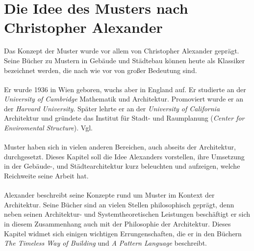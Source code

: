 \documentclass[fontsize=11pt,a4paper,final]{scrreprt}[2003/01/01]
\begin{document}
\chapter{Die Idee des Musters nach Christopher Alexander}\label{Muster}
Das Konzept der Muster wurde vor allem von Christopher Alexander geprägt. Seine Bücher zu Mustern in Gebäude und Städtebau können heute als Klassiker bezeichnet werden, die nach wie vor von großer Bedeutung sind. \\ \\ 
Er wurde 1936 in Wien geboren, wuchs aber in England auf. Er studierte an der\textit{ University of Cambridge} Mathematik und Architektur. Promoviert wurde er an der \textit{Harvard University}. Später lehrte er an der \textit{University of California} Architektur und gründete das Institut für Stadt- und Raumplanung (\textit{Center for Enviromental Structure}). Vgl. \cite{ChristopherAlexanderWikiDe}\\ \\
Muster haben sich in vielen anderen Bereichen, auch abseits der Architektur, durchgesetzt. Dieses Kapitel soll die Idee Alexanders vorstellen, ihre Umsetzung in der Gebäude-, und Städtearchitektur kurz beleuchten und aufzeigen, welche Reichweite seine Arbeit hat. \\ \\
Alexander beschreibt seine Konzepte rund um Muster im Kontext der Architektur. Seine Bücher sind an vielen Stellen philosophisch geprägt, denn neben seinen Architektur- und Systemtheoretischen Leistungen beschäftigt er sich in diesem Zusammenhang auch mit der Philosophie der Architektur. Dieses Kapitel widmet sich einigen wichtigen Errungenschaften, die er in den Büchern \textit{The Timeless Way of Building} \cite{Alexander1975} und \textit{A Pattern Language} \cite{Alexander1977} beschreibt. \\ \\
\end{document}
